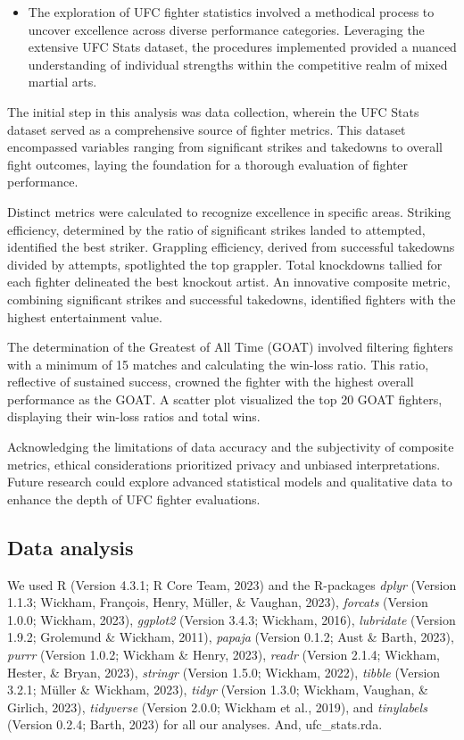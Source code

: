\documentclass[
  man,floatsintext]{apa6}
\providecommand{\tightlist}{%
  \setlength{\itemsep}{0pt}\setlength{\parskip}{0pt}}
\begin{document}
\begin{itemize}
\tightlist
\item
  The exploration of UFC fighter statistics involved a methodical process to uncover excellence across diverse performance categories. Leveraging the extensive UFC Stats dataset, the procedures implemented provided a nuanced understanding of individual strengths within the competitive realm of mixed martial arts.
\end{itemize}

The initial step in this analysis was data collection, wherein the UFC Stats dataset served as a comprehensive source of fighter metrics. This dataset encompassed variables ranging from significant strikes and takedowns to overall fight outcomes, laying the foundation for a thorough evaluation of fighter performance.

Distinct metrics were calculated to recognize excellence in specific areas. Striking efficiency, determined by the ratio of significant strikes landed to attempted, identified the best striker. Grappling efficiency, derived from successful takedowns divided by attempts, spotlighted the top grappler. Total knockdowns tallied for each fighter delineated the best knockout artist. An innovative composite metric, combining significant strikes and successful takedowns, identified fighters with the highest entertainment value.

The determination of the Greatest of All Time (GOAT) involved filtering fighters with a minimum of 15 matches and calculating the win-loss ratio. This ratio, reflective of sustained success, crowned the fighter with the highest overall performance as the GOAT. A scatter plot visualized the top 20 GOAT fighters, displaying their win-loss ratios and total wins.

Acknowledging the limitations of data accuracy and the subjectivity of composite metrics, ethical considerations prioritized privacy and unbiased interpretations. Future research could explore advanced statistical models and qualitative data to enhance the depth of UFC fighter evaluations.

\hypertarget{data-analysis}{%
\subsection{Data analysis}\label{data-analysis}}

We used R (Version 4.3.1; R Core Team, 2023) and the R-packages \emph{dplyr} (Version 1.1.3; Wickham, François, Henry, Müller, \& Vaughan, 2023), \emph{forcats} (Version 1.0.0; Wickham, 2023), \emph{ggplot2} (Version 3.4.3; Wickham, 2016), \emph{lubridate} (Version 1.9.2; Grolemund \& Wickham, 2011), \emph{papaja} (Version 0.1.2; Aust \& Barth, 2023), \emph{purrr} (Version 1.0.2; Wickham \& Henry, 2023), \emph{readr} (Version 2.1.4; Wickham, Hester, \& Bryan, 2023), \emph{stringr} (Version 1.5.0; Wickham, 2022), \emph{tibble} (Version 3.2.1; Müller \& Wickham, 2023), \emph{tidyr} (Version 1.3.0; Wickham, Vaughan, \& Girlich, 2023), \emph{tidyverse} (Version 2.0.0; Wickham et al., 2019), and \emph{tinylabels} (Version 0.2.4; Barth, 2023) for all our analyses. And, ufc\_stats.rda.
\end{document}
